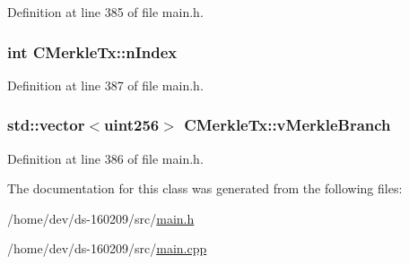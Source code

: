 Definition at line 385 of file main.\+h.

\hypertarget{class_c_merkle_tx_a829655e70702fdf97b6e534dd3227b0b}{}
\subsubsection[{n\+Index}]{\setlength{\rightskip}{0pt plus 5cm}int C\+Merkle\+Tx\+::n\+Index}\label{class_c_merkle_tx_a829655e70702fdf97b6e534dd3227b0b}


Definition at line 387 of file main.\+h.

\hypertarget{class_c_merkle_tx_a9ae6a408be914f486ebbb4161879ee69}{}
\subsubsection[{v\+Merkle\+Branch}]{\setlength{\rightskip}{0pt plus 5cm}std\+::vector$<${\bf uint256}$>$ C\+Merkle\+Tx\+::v\+Merkle\+Branch}\label{class_c_merkle_tx_a9ae6a408be914f486ebbb4161879ee69}


Definition at line 386 of file main.\+h.



The documentation for this class was generated from the following files\+:\begin{DoxyCompactItemize}
\item 
/home/dev/ds-\/160209/src/\hyperlink{main_8h}{main.\+h}\item 
/home/dev/ds-\/160209/src/\hyperlink{main_8cpp}{main.\+cpp}\end{DoxyCompactItemize}
